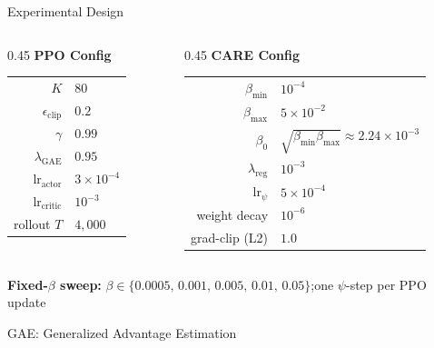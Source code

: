 \documentclass[10pt,aspectratio=169]{beamer}
\begin{document}
\begin{frame}{Experimental Design}
  \begin{columns}[t]
    \begin{column}{0.45\textwidth}
      \centering
      \footnotesize
      \textbf{PPO Config}\\[0.3em]
      \begin{tabular}{r@{\;$=$\;}l}
        \toprule
        $K$                    & $80$            \\
        $\epsilon_\text{clip}$ & $0.2$           \\
        $\gamma$               & $0.99$          \\
        $\lambda_\text{GAE}$   & $0.95$          \\
        lr$_\text{actor}$      & $3{\times}10^{-4}$ \\
        lr$_\text{critic}$     & $10^{-3}$       \\
        rollout $T$            & $4{,}000$       \\
        \bottomrule
      \end{tabular}
    \end{column}
    \hspace{0.06\textwidth}
    \begin{column}{0.45\textwidth}
      \centering
      \footnotesize
      \textbf{CARE Config}\\[0.3em]
      \begin{tabular}{r@{\;$=$\;}l}
        \toprule
        $\beta_\text{min}$   & $10^{-4}$ \\
        $\beta_\text{max}$   & $5{\times}10^{-2}$ \\
        $\beta_0$            & $\sqrt{\beta_\text{min}\beta_\text{max}}\approx 2.24{\times}10^{-3}$ \\
        $\lambda_\text{reg}$ & $10^{-3}$ \\
        lr$_\psi$            & $5{\times}10^{-4}$ \\
        weight decay         & $10^{-6}$ \\
        grad-clip (L2)       & $1.0$ \\
        \bottomrule
      \end{tabular}
    \end{column}
  \end{columns}

  \vspace{0.3cm}

  \centering
  {\footnotesize\textbf{Fixed-$\beta$ sweep:} $\beta \in \{0.0005,\,0.001,\,0.005,\,0.01,\,0.05\}$;\quad one $\psi$-step per PPO update\par}

  \vspace{0.2cm}
  {\scriptsize\color{softgray} GAE: Generalized Advantage Estimation\par}
\end{frame}
\end{document}
